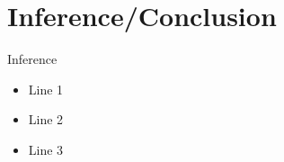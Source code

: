\section{Inference/Conclusion}

\begin{frame}{Inference}
\begin{itemize}
        \item Line 1
        \item Line 2
        \item Line 3
\end{itemize}
  
\end{frame}
